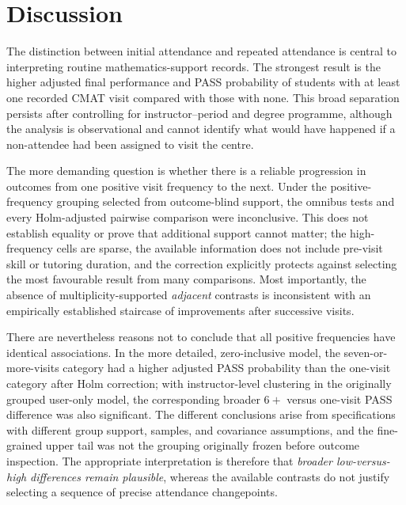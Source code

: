 \section{Discussion}

The distinction between initial attendance and repeated attendance is central to interpreting routine mathematics-support records. The strongest result is the higher adjusted final performance and PASS probability of students with at least one recorded CMAT visit compared with those with none. This broad separation persists after controlling for instructor--period and degree programme, although the analysis is observational and cannot identify what would have happened if a non-attendee had been assigned to visit the centre.

The more demanding question is whether there is a reliable progression in outcomes from one positive visit frequency to the next. Under the positive-frequency grouping selected from outcome-blind support, the omnibus tests and every Holm-adjusted pairwise comparison were inconclusive. This does not establish equality or prove that additional support cannot matter; the high-frequency cells are sparse, the available information does not include pre-visit skill or tutoring duration, and the correction explicitly protects against selecting the most favourable result from many comparisons. Most importantly, the absence of multiplicity-supported \emph{adjacent} contrasts is inconsistent with an empirically established staircase of improvements after successive visits.

There are nevertheless reasons not to conclude that all positive frequencies have identical associations. In the more detailed, zero-inclusive model, the seven-or-more-visits category had a higher adjusted PASS probability than the one-visit category after Holm correction; with instructor-level clustering in the originally grouped user-only model, the corresponding broader $6+$ versus one-visit PASS difference was also significant. The different conclusions arise from specifications with different group support, samples, and covariance assumptions, and the fine-grained upper tail was not the grouping originally frozen before outcome inspection. The appropriate interpretation is therefore that \emph{broader low-versus-high differences remain plausible}, whereas the available contrasts do not justify selecting a sequence of precise attendance changepoints.

